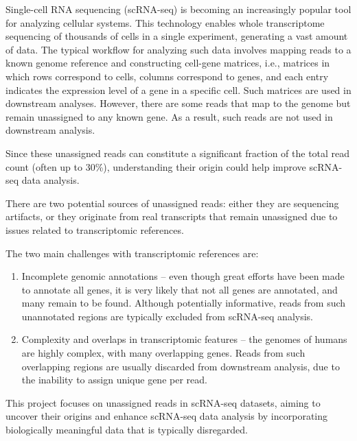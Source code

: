 Single-cell RNA sequencing (scRNA-seq) is becoming an increasingly popular tool for analyzing cellular systems.
This technology enables whole transcriptome sequencing of thousands of cells in a single experiment, generating a vast amount of data.
The typical workflow for analyzing such data involves mapping reads to a known genome reference and constructing cell-gene matrices,
i.e., matrices in which rows correspond to cells, columns correspond to genes,
and each entry indicates the expression level of a gene in a specific cell.
Such matrices are used in downstream analyses.
However, there are some reads that map to the genome but remain unassigned to any known gene.
As a result, such reads are not used in downstream analysis.

Since these unassigned reads can constitute a significant fraction of the total read count (often up to 30\%),
understanding their origin could help improve scRNA-seq data analysis.

There are two potential sources of unassigned reads: either they are sequencing artifacts,
or they originate from real transcripts that remain unassigned due to issues related to transcriptomic references.

The two main challenges with transcriptomic references are:

\begin{enumerate}
  \item Incomplete genomic annotations –
  even though great efforts have been made to annotate all genes, it is very likely that not all genes are annotated,
  and many remain to be found.
  Although potentially informative, reads from such unannotated regions are typically excluded from scRNA-seq analysis.
  \item Complexity and overlaps in transcriptomic features – the genomes of humans are highly complex,
   with many overlapping genes.
   Reads from such overlapping regions are usually discarded from downstream analysis,
   due to the inability to assign unique gene per read.
\end{enumerate}

This project focuses on unassigned reads in scRNA-seq datasets, aiming to uncover their origins and 
enhance scRNA-seq data analysis by incorporating biologically meaningful data that is typically disregarded.
